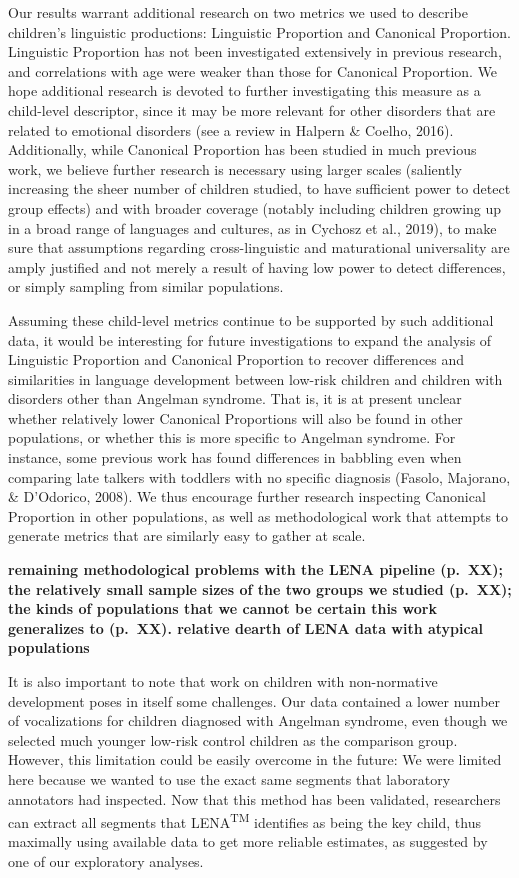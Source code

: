 \documentclass[english,,man]{apa6}
\begin{document}
Our results warrant additional research on two metrics we used to describe children's linguistic productions: Linguistic Proportion and Canonical Proportion. Linguistic Proportion has not been investigated extensively in previous research, and correlations with age were weaker than those for Canonical Proportion. We hope additional research is devoted to further investigating this measure as a child-level descriptor, since it may be more relevant for other disorders that are related to emotional disorders (see a review in Halpern \& Coelho, 2016). Additionally, while Canonical Proportion has been studied in much previous work, we believe further research is necessary using larger scales (saliently increasing the sheer number of children studied, to have sufficient power to detect group effects) and with broader coverage (notably including children growing up in a broad range of languages and cultures, as in Cychosz et al., 2019), to make sure that assumptions regarding cross-linguistic and maturational universality are amply justified and not merely a result of having low power to detect differences, or simply sampling from similar populations.

Assuming these child-level metrics continue to be supported by such additional data, it would be interesting for future investigations to expand the analysis of Linguistic Proportion and Canonical Proportion to recover differences and similarities in language development between low-risk children and children with disorders other than Angelman syndrome. That is, it is at present unclear whether relatively lower Canonical Proportions will also be found in other populations, or whether this is more specific to Angelman syndrome. For instance, some previous work has found differences in babbling even when comparing late talkers with toddlers with no specific diagnosis (Fasolo, Majorano, \& D'Odorico, 2008). We thus encourage further research inspecting Canonical Proportion in other populations, as well as methodological work that attempts to generate metrics that are similarly easy to gather at scale.

\textbf{remaining methodological problems with the LENA pipeline (p.~XX);
the relatively small sample sizes of the two groups we studied (p.~XX);
the kinds of populations that we cannot be certain this work generalizes to (p.~XX).
relative dearth of LENA data with atypical populations }

It is also important to note that work on children with non-normative development poses in itself some challenges. Our data contained a lower number of vocalizations for children diagnosed with Angelman syndrome, even though we selected much younger low-risk control children as the comparison group. However, this limitation could be easily overcome in the future: We were limited here because we wanted to use the exact same segments that laboratory annotators had inspected. Now that this method has been validated, researchers can extract all segments that LENA\textsuperscript{TM} identifies as being the key child, thus maximally using available data to get more reliable estimates, as suggested by one of our exploratory analyses.
\end{document}
